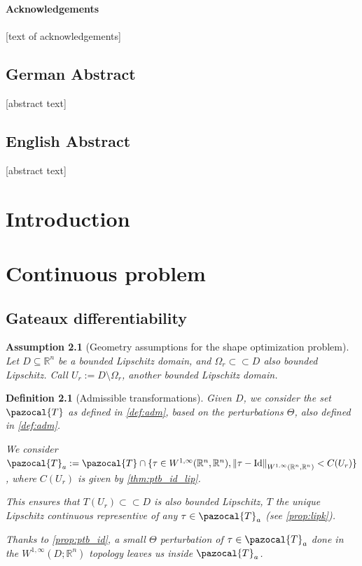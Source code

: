 \documentclass[english,a4paper,12pt,oneside]{scrbook}
\theoremstyle{break}
\newtheorem{defn}[equation]{Definition}
\newtheorem{ass}[equation]{Assumption}
\theoremstyle{remark}
\newcommand{\mR}{\mathbb{R}}
\newcommand{\norm}[1]{\left\lVert#1\right\rVert}
\newcommand{\cc}{\subset\subset}
\newcommand{\cT}{\pazocal{T}}
\newcommand{\id}{\text{Id}}
\newcommand{\Te}{\Theta}
\begin{document}
\vspace*{2.2cm}
\noindent %
{\Huge \textbf{Acknowledgements}} \\
\vspace*{1.6cm} \\
\pagestyle{headings}
[text of acknowledgements]

\newpage
\section*{German Abstract}
[abstract text]
\section*{English Abstract}
[abstract text]
\newpage
\tableofcontents  


\chapter{Introduction}  \setcounter{page}{1}   %

\chapter{Continuous problem}

\section{Gateaux differentiability}

\begin{ass}[Geometry assumptions for the shape optimization problem]
\label{ass:geo_sh}
Let $D\subseteq \mR^n$ be a bounded Lipschitz domain, and $\Omega_r \cc D$ also bounded Lipschitz. Call $U_r:=D\setminus \Omega_r$, another bounded Lipschitz domain.
\end{ass}

\begin{defn}[Admissible transformations]

Given $D$, we consider the set $\cT$ as defined in \cref{def:adm}, based on the perturbations $\Te$, also defined in \cref{def:adm}.

We consider $\cT_a:=\cT \cap \{ \tau \in W^{1,\infty}(\mR^n, \mR^n), \norm{\tau - \id}_{W^{1,\infty}(\mR^n, \mR^n)}<C(U_r)\}$, where $C(U_r)$ is given by \cref{thm:ptb_id_lip}.

This ensures that $T(U_r)\cc D$ is also bounded Lipschitz, $T$ the unique Lipschitz continuous representive of any $\tau \in \cT_a$ (see \cref{prop:lipk}).

Thanks to \cref{prop:ptb_id}, a small $\Te$ perturbation of $\tau \in \cT_a$ done in the $W^{1,\infty}(D;\mR^n)$ topology leaves us inside $\cT_a$.

\end{defn}
\end{document}
